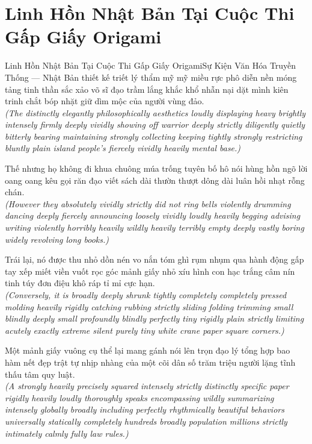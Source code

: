 \section{Linh Hồn Nhật Bản Tại Cuộc Thi Gấp Giấy Origami}
\begin{truyen}{Linh Hồn Nhật Bản Tại Cuộc Thi Gấp Giấy Origami}{Sự Kiện Văn Hóa Truyền Thống --- Nhật Bản}
 thiết kế triết lý thẩm mỹ mỹ miều rực phô diễn nền móng tảng tinh thần sắc xảo võ sĩ đạo trầm lắng khắc khổ nhẫn nại dặt mình kiên trinh chắt bóp nhặt giữ dìm mộc của người vùng đảo.\\[4pt]
\textit{(The distinctly elegantly philosophically aesthetics loudly displaying heavy brightly intensely firmly deeply vividly showing off warrior deeply strictly diligently quietly bitterly bearing maintaining strongly collecting keeping tightly strongly restricting bluntly plain island people's fiercely vividly heavily mental base.)}

Thế nhưng họ không đi khua chuông múa trống tuyên bố hô nói hùng hồn ngõ lời oang oang kêu gọi răn đạo viết sách dài thườn thượt dông dài luân hồi nhạt rỗng chán.\\[4pt]
\textit{(However they absolutely vividly strictly did not ring bells violently drumming dancing deeply fiercely announcing loosely vividly loudly heavily begging advising writing violently horribly heavily wildly heavily terribly empty deeply vastly boring widely revolving long books.)}

Trái lại, nó được thu nhỏ dồn nén vo nắn tóm ghì rụm nhụm qua hành động gấp tay xếp miết viền vuốt rọc góc mảnh giấy nhỏ xíu hình con hạc trắng câm nín tinh túy đơn điệu khô ráp tỉ mỉ cực hạn.\\[4pt]
\textit{(Conversely, it is broadly deeply shrunk tightly completely completely pressed molding heavily rigidly catching rubbing strictly sliding folding trimming small blindly deeply small profoundly blindly perfectly tiny rigidly plain strictly limiting acutely exactly extreme silent purely tiny white crane paper square corners.)}

Một mảnh giấy vuông cụ thể lại mang gánh nói lên trọn đạo lý tổng hợp bao hàm nết đẹp trật tự nhịp nhàng của một cõi dân số trăm triệu người lặng tĩnh thấu tâm quy luật.\\[4pt]
\textit{(A strongly heavily precisely squared intensely strictly distinctly specific paper rigidly heavily loudly thoroughly speaks encompassing wildly summarizing intensely globally broadly including perfectly rhythmically beautiful behaviors universally statically completely hundreds broadly population millions strictly intimately calmly fully law rules.)}

\end{truyen}

